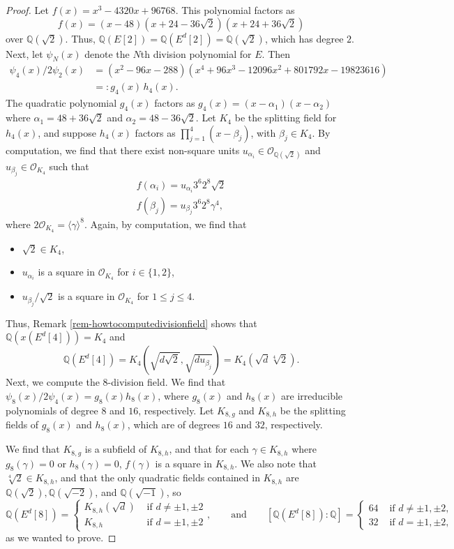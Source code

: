 \documentclass[10pt,a4paper]{amsart}
\newcommand{\OO}{\mathcal{O}}
\newcommand{\Q}{\mathbb Q}
\begin{document}
\begin{proof}
    Let $f(x) = x^3 - 4320x + 96768$. This polynomial factors as 
    \[ f(x) = (x-48)(x + 24 - 36 \sqrt{2})(x + 24 + 36 \sqrt{2}) \]
    over $\Q(\sqrt{2})$. Thus, $\Q(E[2]) = \Q(E^d[2]) = \Q(\sqrt{2})$, which has degree $2$. Next, let $\psi_N(x)$ denote the $N$th division polynomial for $E$. Then 
    \begin{align*}
        \psi_4(x)/2 \psi_2(x) 
        &= (x^2 - 96x - 288)(x^4 + 96x^3 - 12096x^2 + 801792x - 19823616) \\
        &=: g_4(x) \, h_4(x).
    \end{align*}
The quadratic polynomial $g_4(x)$ factors as $g_4(x) = (x - \alpha_1)(x - \alpha_2)$ where $\alpha_1 = 48 + 36 \sqrt{2}$ and $\alpha_2 = 48 - 36 \sqrt{2}$. Let $K_4$ be the splitting field for $h_4(x)$, and suppose $h_4(x)$ factors as $\prod_{j=1}^{4} (x - \beta_j)$, with $\beta_j \in K_4$. By computation, we find that there exist non-square units $u_{\alpha_i} \in \OO_{\Q(\sqrt{2})}$ and $u_{\beta_j} \in \OO_{K_4}$ such that 
\begin{align*}
    f(\alpha_i) = u_{\alpha_i} 3^{6} 2^{8} \sqrt{2} \\
   f(\beta_j) = u_{\beta_j} 3^6 2^8 \gamma^4,
\end{align*}
where $2 \OO_{K_4} = \langle \gamma \rangle^8$.
Again, by computation, we find that
\begin{itemize}
    \item $\sqrt{2} \in K_4$,
    \item $u_{\alpha_i}$ is a square in $\OO_{K_4}$ for $i \in \{1, 2\}$,
    \item $u_{\beta_j}/\sqrt{2}$ is a square in $\OO_{K_4}$ for $1 \leq j \leq 4$.
\end{itemize}
Thus, Remark \ref{rem-howtocomputedivisionfield} shows that  $\Q(x(E^d[4])) = K_4$ and
\[ \Q(E^d[4]) = K_4 \left(\sqrt{d \sqrt{2}}, \sqrt{d u_{\beta_j}} \right) = K_4\left(\sqrt{d} \sqrt[4]{2}\right). \]
Next, we compute the $8$-division field. We find that $\psi_8(x)/2 \psi_4(x) = g_8(x) h_8(x)$, where $g_8(x)$ and $h_8(x)$ are irreducible polynomials of degree $8$ and $16$, respectively. Let $K_{8,g}$ and $K_{8,h}$ be the splitting fields of $g_8(x)$ and $h_8(x)$, which are of degrees $16$ and $32$, respectively.

We find that $K_{8,g}$ is a subfield of $K_{8,h}$, and that for each $\gamma \in K_{8,h}$ where $g_{8}(\gamma) = 0$ or $h_8(\gamma) = 0$, $f(\gamma)$ is a square in $K_{8,h}$. We also note that $\sqrt[4]{2} \in K_{8,h}$, and that the only quadratic fields contained in $K_{8, h}$ are $\Q(\sqrt{2}), \Q(\sqrt{-2})$, and $\Q(\sqrt{-1})$, so
\[ \Q(E^{d}[8]) = 
\begin{cases}
K_{8,h}(\sqrt{d}) & \text{ if } d \neq \pm 1, \pm 2 \\
K_{8,h} & \text{ if } d = \pm 1, \pm 2
\end{cases}, \qquad \text{and} \qquad [\Q(E^{d}[8]) : \Q] = 
\begin{cases}
64 & \text{ if } d \neq \pm 1, \pm 2, \\
32 & \text{ if } d = \pm 1, \pm 2,
\end{cases} \]
as we wanted to prove.
\end{proof}
\end{document}
